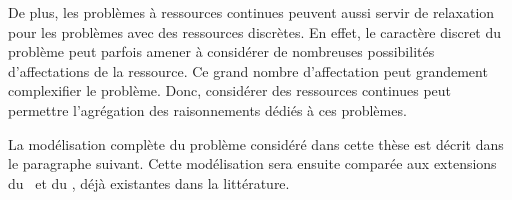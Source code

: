 De plus, les problèmes à ressources continues peuvent aussi servir de
relaxation pour les problèmes avec des ressources discrètes. En effet,
le caractère discret du problème peut parfois amener à considérer de
nombreuses possibilités d'affectations de la ressource. Ce grand nombre
d'affectation peut grandement complexifier le problème. Donc,
considérer des ressources continues peut permettre l'agrégation des
raisonnements dédiés à ces problèmes. 

La modélisation complète du problème considéré dans cette thèse est
décrit dans le paragraphe suivant. Cette modélisation sera ensuite
comparée aux extensions du \CUSP~et du \RCPSP, déjà existantes dans la
littérature. 

